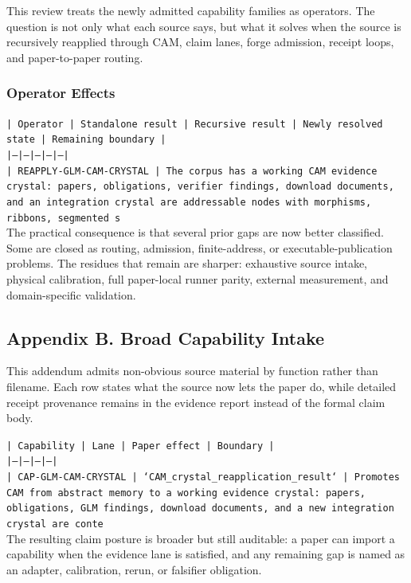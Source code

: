 \documentclass[11pt]{article}
\begin{document}
This review treats the newly admitted capability families as operators. The question is not only what each source says, but what it solves when the source is recursively reapplied through CAM, claim lanes, forge admission, receipt loops, and paper-to-paper routing.

\subsubsection*{Operator Effects}

\noindent\texttt{| Operator | Standalone result | Recursive result | Newly resolved state | Remaining boundary |}\\
\noindent\texttt{|---|---|---|---|---|}\\
\noindent\texttt{| REAPPLY-GLM-CAM-CRYSTAL | The corpus has a working CAM evidence crystal: papers, obligations, verifier findings, download documents, and an integration crystal are addressable nodes with morphisms, ribbons, segmented s}\\

The practical consequence is that several prior gaps are now better classified. Some are closed as routing, admission, finite-address, or executable-publication problems. The residues that remain are sharper: exhaustive source intake, physical calibration, full paper-local runner parity, external measurement, and domain-specific validation.

\subsection*{Appendix B. Broad Capability Intake}

This addendum admits non-obvious source material by function rather than filename. Each row states what the source now lets the paper do, while detailed receipt provenance remains in the evidence report instead of the formal claim body.

\noindent\texttt{| Capability | Lane | Paper effect | Boundary |}\\
\noindent\texttt{|---|---|---|---|}\\
\noindent\texttt{| CAP-GLM-CAM-CRYSTAL | `CAM\_crystal\_reapplication\_result` | Promotes CAM from abstract memory to a working evidence crystal: papers, obligations, GLM findings, download documents, and a new integration crystal are conte}\\

The resulting claim posture is broader but still auditable: a paper can import a capability when the evidence lane is satisfied, and any remaining gap is named as an adapter, calibration, rerun, or falsifier obligation.
\end{document}
